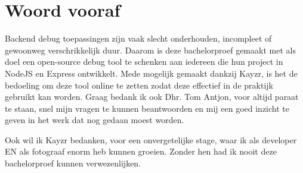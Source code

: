 
\chapter*{Woord vooraf}
\label{ch:voorwoord}


Backend debug toepassingen zijn vaak slecht onderhouden, incompleet of gewoonweg verschrikkelijk duur. Daarom is deze bachelorproef gemaakt met als doel een open-source debug tool te schenken aan iedereen die hun project in NodeJS en Express ontwikkelt. Mede mogelijk gemaakt dankzij Kayzr, is het de bedoeling om deze tool online te zetten zodat deze effectief in de praktijk gebruikt kan worden. Graag bedank ik ook Dhr. Tom Antjon, voor altijd paraat te staan, snel mijn vragen te kunnen beantwoorden en mij een goed inzicht te geven in het werk dat nog gedaan moest worden.

Ook wil ik Kayzr bedanken, voor een onvergetelijke stage, waar ik als developer EN als fotograaf enorm heb kunnen groeien. Zonder hen had ik nooit deze bachelorproef kunnen verwezenlijken.


